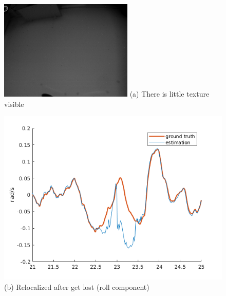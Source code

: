 \begin{figure}
  \begin{minipage}[t]{0.48\textwidth}
    \centering \includegraphics[width =
    \textwidth]{images/frame_00000520.png}
      (a) There is little texture visible
  \end{minipage}
  \hfill
  \begin{minipage}[t]{0.48\textwidth}
    \centering \includegraphics[width =
    \textwidth]{images/shapes_tr_lost.png}
       (b) Relocalized after get lost (roll component)
  \end{minipage}


\end{figure}
